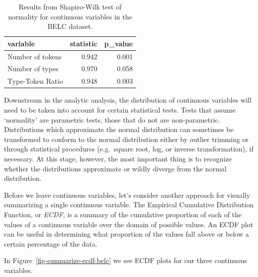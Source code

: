 \documentclass[
  letterpaper,
]{scrbook}
\begin{document}
\hypertarget{tbl-summaries-normality-test-belc}{}
\begin{table}
\caption{\label{tbl-summaries-normality-test-belc}Results from Shapiro-Wilk test of normality for continuous variables in
the BELC dataset. }\tabularnewline

\centering
\begin{tabular}{lrr}
\toprule
variable & statistic & p\_value\\
\midrule
Number of tokens & 0.942 & 0.001\\
Number of types & 0.970 & 0.058\\
Type-Token Ratio & 0.948 & 0.003\\
\bottomrule
\end{tabular}
\end{table}

Downstream in the analytic analysis, the distribution of continuous
variables will need to be taken into account for certain statistical
tests. Tests that assume `normality' are parametric tests, those that do
not are non-parametric. Distributions which approximate the normal
distribution can sometimes be transformed to conform to the normal
distribution either by outlier trimming or through statistical
procedures (e.g.~square root, log, or inverse transformation), if
necessary. At this stage, however, the most important thing is to
recognize whether the distributions approximate or wildly diverge from
the normal distribution.

Before we leave continuous variables, let's consider another approach
for visually summarizing a single continuous variable. The Empirical
Cumulative Distribution Function, or \emph{ECDF}, is a summary of the
cumulative proportion of each of the values of a continuous variable
over the domain of possible values. An ECDF plot can be useful in
determining what proportion of the values fall above or below a certain
percentage of the data.

In Figure~\ref{fig-summarize-ecdf-belc} we see ECDF plots for our three
continuous variables.
\end{document}
